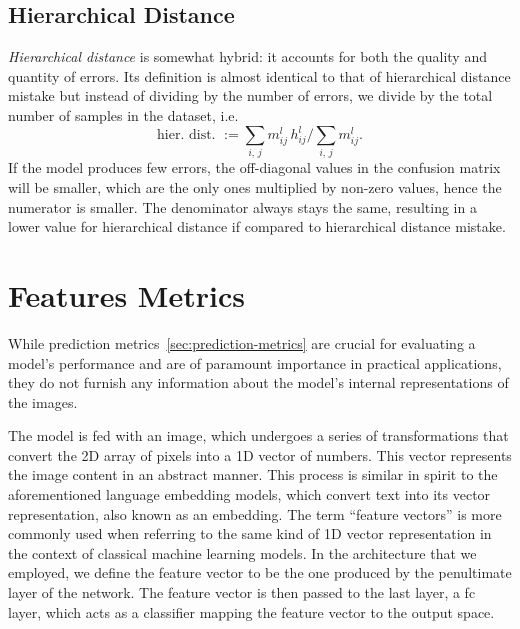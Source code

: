 \subsection{Hierarchical Distance}
\label{subsec:hierarchical-distance}
\emph{Hierarchical distance} is somewhat hybrid: it accounts for both the quality and quantity of errors. Its definition is almost identical to that of hierarchical distance mistake but instead of dividing by the number of errors, we divide by the total number of samples in the dataset, i.e.\
\begin{equation}
  \textrm{hier.\ dist.\ } :=
  \sum_{i, \, j} m_{ij}^l \, h_{ij}^l \bigg/ \sum_{i, \, j} m_{ij}^l.
  \label{eq:hierarchical-distance}
\end{equation}
If the model produces few errors, the off-diagonal values in the confusion matrix will be smaller, which are the only ones multiplied by non-zero values, hence the numerator is smaller. The denominator always stays the same, resulting in a lower value for hierarchical distance if compared to hierarchical distance mistake.

\section{Features Metrics}
\label{sec:features-metrics}

While prediction metrics~\ref{sec:prediction-metrics} are crucial for evaluating a model's performance and are of paramount importance in practical applications, they do not furnish any information about the model's internal representations of the images.

The model is fed with an image, which undergoes a series of transformations that convert the 2D array of pixels into a 1D vector of numbers. This vector represents the image content in an abstract manner. This process is similar in spirit to the aforementioned language embedding models, which convert text into its vector representation, also known as an embedding. The term ``feature vectors'' is more commonly used when referring to the same kind of 1D vector representation in the context of classical machine learning models. In the architecture that we employed, we define the feature vector to be the one produced by the penultimate layer of the network. The feature vector is then passed to the last layer, a \acrshort{fc} layer, which acts as a classifier mapping the feature vector to the output space.

